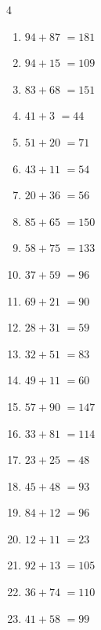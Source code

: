 \begin{multicols}{4}
\begin{enumerate}
  \item $94+87$
        $=181$

  \item $94+15$
        $=109$

  \item $83+68$
        $=151$

  \item $41+3$
        $=44$

  \item $51+20$
        $=71$

  \item $43+11$
        $=54$

  \item $20+36$
        $=56$

  \item $85+65$
        $=150$

  \item $58+75$
        $=133$

  \item $37+59$
        $=96$

  \item $69+21$
        $=90$

\columnbreak %

  \item $28+31$
        $=59$

  \item $32+51$
        $=83$

  \item $49+11$
        $=60$

  \item $57+90$
        $=147$

  \item $33+81$
        $=114$

  \item $23+25$
        $=48$

  \item $45+48$
        $=93$

  \item $84+12$
        $=96$

  \item $12+11$
        $=23$

  \item $92+13$
        $=105$

  \item $36+74$
        $=110$

  \item $41+58$
        $=99$


\end{enumerate}
\end{multicols}
